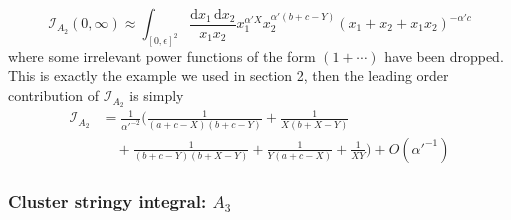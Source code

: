 \documentclass[12pt]{article}
\theoremstyle{definition}
\theoremstyle{plain}
\newcommand{\dif}{\mathrm{d}} %
\begin{document}
\[
    \mathcal{I}_{A_{2}}(0,\infty) \approx \int_{[0,\epsilon]^{2}} \frac{\dif x_{1}\,\dif x_{2}}{x_{1} x_{2}} x_{1}^{\alpha'X}x_{2}^{\alpha'(b+c-Y)}(x_{1}+x_{2}+x_{1}x_{2})^{-\alpha'c}
\]
where some irrelevant power functions of the form $(1+\cdots)$ have been dropped. This is exactly the example we used in section 2, then the leading order contribution of $\mathcal{I}_{A_{2}}$ is simply
\begin{align*}
   \mathcal{I}_{A_2}&=\frac{1}{\alpha'^{-2}}\biggl(\frac{1}{(a+c-X) (b+c-Y)}+\frac{1}{X (b+X-Y)} \\
   &\quad +\frac{1}{(b+c-Y) (b+X-Y)}+\frac{1}{Y (a+c-X)}+\frac{1}{X Y}\biggr) + O(\alpha'^{-1}) 
\end{align*}

\subsubsection*{Cluster stringy integral: $A_3$}
\end{document}
